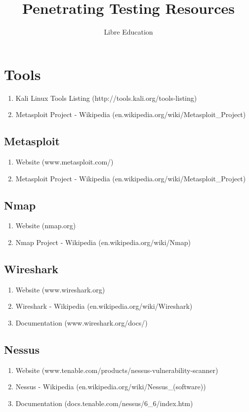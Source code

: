 \documentclass[a4paper]{article}
\title{Penetrating Testing Resources}
\date{}
\author{Libre Education}
\begin{document}
\maketitle

\newpage

\section{Tools}

\begin{enumerate}
	\item Kali Linux Tools Listing (http://tools.kali.org/tools-listing)
	\item Metasploit Project - Wikipedia (en.wikipedia.org/wiki/Metasploit\_Project)
\end{enumerate}

\subsection{Metasploit}
\begin{enumerate}
	\item Website (www.metasploit.com/)
	\item Metasploit Project - Wikipedia (en.wikipedia.org/wiki/Metasploit\_Project)
\end{enumerate}

\subsection{Nmap}
\begin{enumerate}
	\item Website (nmap.org)
	\item Nmap Project - Wikipedia (en.wikipedia.org/wiki/Nmap)
\end{enumerate}

\subsection{Wireshark}
\begin{enumerate}
	\item Website (www.wireshark.org)
	\item Wireshark - Wikipedia (en.wikipedia.org/wiki/Wireshark)
    \item Documentation (www.wireshark.org/docs/)
\end{enumerate}

\subsection{Nessus}
\begin{enumerate}
	\item Website (www.tenable.com/products/nessus-vulnerability-scanner)
	\item Nessus - Wikipedia (en.wikipedia.org/wiki/Nessus\_(software))
    \item Documentation (docs.tenable.com/nessus/6\_6/index.htm)
\end{enumerate}
\end{document}

